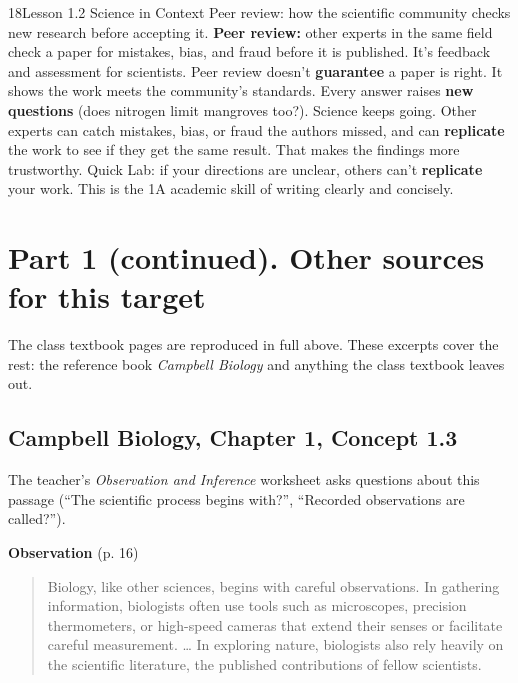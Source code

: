 \documentclass[11pt,letterpaper]{article}
\begin{document}
\begin{tbpage}{18}{Lesson 1.2 Science in Context}
  {Peer review: how the scientific community checks new research before accepting it.}
    {\textbf{Peer review:} other experts in the same field check a paper for mistakes, bias, and fraud before it is published. It's feedback and assessment for scientists.}
    {Peer review doesn't \textbf{guarantee} a paper is right. It shows the work meets the community's standards.}
    {Every answer raises \textbf{new questions} (does nitrogen limit mangroves too?). Science keeps going.}
    {Other experts can catch mistakes, bias, or fraud the authors missed, and can \textbf{replicate} the work to see if they get the same result. That makes the findings more trustworthy.}
    {Quick Lab: if your directions are unclear, others can't \textbf{replicate} your work. This is the 1A academic skill of writing clearly and concisely.}
\end{tbpage}

\section{Part 1 (continued). Other sources for this target}

The class textbook pages are reproduced in full above. These excerpts cover the rest: the reference book \emph{Campbell Biology} and anything the class textbook leaves out.

\subsection{Campbell Biology, Chapter 1, Concept 1.3}

The teacher's \emph{Observation and Inference} worksheet asks questions about this passage (``The scientific process begins with?'', ``Recorded observations are called?'').

\textbf{Observation} (p. 16)

\begin{quote}
Biology, like other sciences, begins with careful observations. In gathering information, biologists often use tools such as microscopes, precision thermometers, or high-speed cameras that extend their senses or facilitate careful measurement. \dots{} In exploring nature, biologists also rely heavily on the scientific literature, the published contributions of fellow scientists.
\end{quote}
\end{document}

